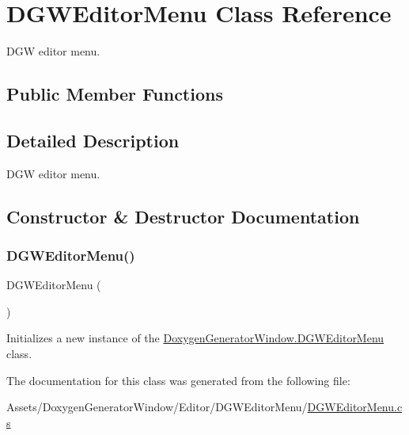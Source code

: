 \hypertarget{classDoxygenGeneratorWindow_1_1DGWEditorMenu}{}\section{D\+G\+W\+Editor\+Menu Class Reference}
\label{classDoxygenGeneratorWindow_1_1DGWEditorMenu}


D\+GW editor menu.  


\subsection*{Public Member Functions}


\subsection{Detailed Description}
D\+GW editor menu. 



\subsection{Constructor \& Destructor Documentation}
\mbox{\label{classDoxygenGeneratorWindow_1_1DGWEditorMenu_abc03c777b285ed315fc74db7340b3664}} 
\subsubsection{\texorpdfstring{D\+G\+W\+Editor\+Menu()}{DGWEditorMenu()}}
{\footnotesize\ttfamily D\+G\+W\+Editor\+Menu (\begin{DoxyParamCaption}{ }\end{DoxyParamCaption})}



Initializes a new instance of the \hyperlink{classDoxygenGeneratorWindow_1_1DGWEditorMenu}{Doxygen\+Generator\+Window.\+D\+G\+W\+Editor\+Menu} class. 



The documentation for this class was generated from the following file\+:\begin{DoxyCompactItemize}
\item 
Assets/\+Doxygen\+Generator\+Window/\+Editor/\+D\+G\+W\+Editor\+Menu/\hyperlink{DGWEditorMenu_8cs}{D\+G\+W\+Editor\+Menu.\+cs}\end{DoxyCompactItemize}
